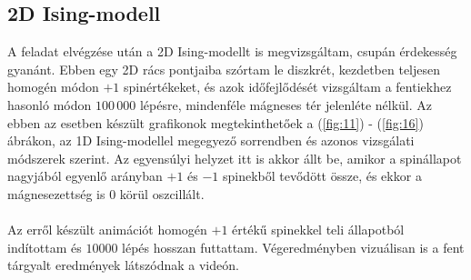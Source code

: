 \subsection{2D Ising-modell}
A feladat elvégzése után a 2D Ising-modellt is megvizsgáltam, csupán érdekesség gyanánt. Ebben egy 2D rács pontjaiba szórtam le diszkrét, kezdetben teljesen homogén módon $+1$ spinértékeket, és azok időfejlődését vizsgáltam a fentiekhez hasonló módon $100\,000$ lépésre, mindenféle mágneses tér jelenléte nélkül. Az ebben az esetben készült grafikonok megtekinthetőek a (\ref{fig:11}) - (\ref{fig:16}) ábrákon, az 1D Ising-modellel megegyező sorrendben és azonos vizsgálati módszerek szerint. Az egyensúlyi helyzet itt is akkor állt be, amikor a spinállapot nagyjából egyenlő arányban $+1$ és $-1$ spinekből tevődött össze, és ekkor a mágnesezettség is $0$ körül oszcillált.
\\ \\
Az erről készült animációt\cite{yt} homogén $+1$ értékű spinekkel teli állapotból indítottam és $10000$ lépés hosszan futtattam. Végeredményben vizuálisan is a fent tárgyalt eredmények látszódnak a videón.